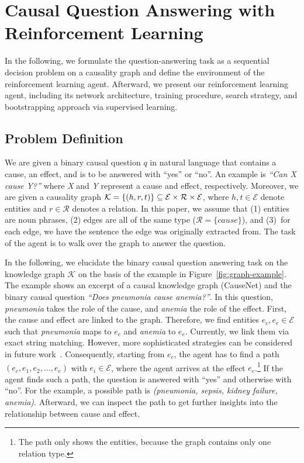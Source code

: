 \section{Causal Question Answering with Reinforcement Learning}
\label{sec:approach}

In the following, we formulate the question-answering task as a sequential decision problem on a causality graph and define the environment of the reinforcement learning agent. Afterward, we present our reinforcement learning agent, including its network architecture, training procedure, search strategy, and bootstrapping approach via supervised learning. 


\subsection{Problem Definition}
\label{subsec:problem-def-env}



We are given a binary causal question $q$ in natural language that contains a cause, an effect, and is to be answered with ``yes'' or ``no''. An example is \textit{``Can X cause Y?''} where \textit{X} and \textit{Y} represent a cause and effect, respectively. Moreover, we are given a causality graph  $\mathcal{K} = \{ (h, r, t) \} \subseteq \mathcal{E} \times \mathcal{R} \times \mathcal{E}$, where $h,t \in \mathcal{E}$ denote entities and $r \in \mathcal{R}$ denotes a relation. In this paper, we assume that (1) entities are noun phrases, (2) edges are all of the same type ($\mathcal{R} = \{cause\}$), and (3)~for each edge, we have the sentence the edge was originally extracted from. The task of the agent is to walk over the graph to answer the question.

In the following, we elucidate the binary causal question answering task on the knowledge graph $\mathcal{K}$ on the basis of the example in Figure~\ref{fig:graph-example}. The example shows an excerpt of a causal knowledge graph (CauseNet) and the  binary causal question \textit{``Does pneumonia cause anemia?''}. In this question, \textit{pneumonia} takes the role of the cause, and \textit{anemia} the role of the effect. First, the cause and effect are linked to the graph. Therefore, we find entities $e_c, e_e \in \mathcal{E}$ such that \textit{pneumonia} maps to $e_c$ and \textit{anemia} to $e_e$. Currently, we link them via exact string matching. However, more sophisticated strategies can be considered in future work~\cite{Kaiser2021Reinforcement}. Consequently, starting from $e_c$, the agent has to find a path $(e_c, e_1, e_2, \dots, e_e)$ with $e_i \in \mathcal{E}$, where the agent arrives at the effect $e_e$.\footnote{The path only shows the entities, because the graph contains only one relation type.} If the agent finds such a path, the question is answered with ``yes'' and otherwise with ``no''. For the example, a possible path is \textit{(pneumonia, sepsis, kidney failure, anemia)}. Afterward, we can inspect the path to get further insights into the relationship between cause and effect.



